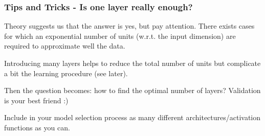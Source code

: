 \documentclass{beamer}
\begin{document}
	\begin{frame}
		\frametitle{Tips and Tricks - Is one layer really enough?}
		Theory suggests us that the answer is yes, but pay attention. There exists cases for which an exponential number of units (w.r.t. the input dimension) are required to approximate well the data.
		
		\vspace{5mm}
		
		Introducing many layers helps to reduce the total number of units but complicate a bit the learning procedure (see later).
		
		\vspace{5mm}
		
		Then the question becomes: how to find the optimal number of layers? Validation is your best friend :)
		
		Include in your model selection process as many different architectures/activation functions as you can.
	\end{frame}
\end{document}
